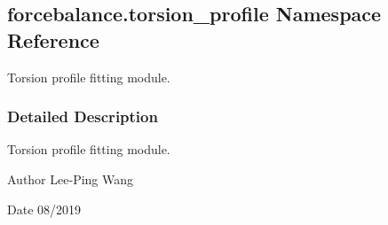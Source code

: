 \hypertarget{namespaceforcebalance_1_1torsion__profile}{}\subsection{forcebalance.\+torsion\+\_\+profile Namespace Reference}
\label{namespaceforcebalance_1_1torsion__profile}


Torsion profile fitting module.  




\subsubsection{Detailed Description}
Torsion profile fitting module. 

\begin{DoxyAuthor}{Author}
Lee-\/\+Ping Wang 
\end{DoxyAuthor}
\begin{DoxyDate}{Date}
08/2019 
\end{DoxyDate}
